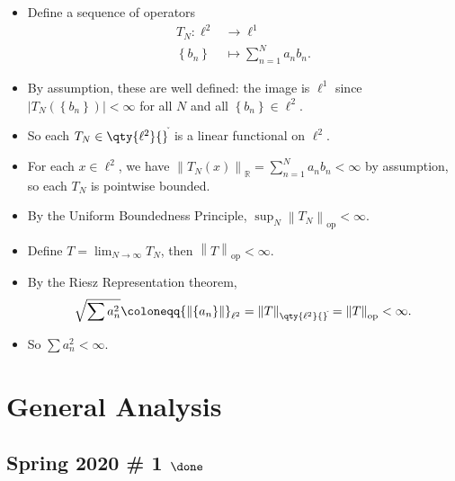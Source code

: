 
\begin{solution}

\envlist

\begin{itemize}
\item
  Define a sequence of operators
  \begin{align*}  
  T_N: \ell^2 &\to \ell^1\\
  \left\{{b_n}\right\} &\mapsto \sum_{n=1}^N a_n b_n
  .\end{align*}
\item
  By assumption, these are well defined: the image is \(\ell^1\) since
  \({\left\lvert {T_N(\left\{{b_n}\right\})} \right\rvert} < \infty\)
  for all \(N\) and all \(\left\{{b_n}\right\} \in \ell^2\).
\item
  So each \(T_N \in \qty{\ell^2} {}^{ \check{} }\) is a linear
  functional on \(\ell^2\).
\item
  For each \(x\in \ell^2\), we have
  \({\left\lVert {T_N(x)} \right\rVert}_{{\mathbb{R}}} = \sum_{n=1}^N a_n b_n < \infty\)
  by assumption, so each \(T_N\) is pointwise bounded.
\item
  By the Uniform Boundedness Principle,
  \(\sup_N {\left\lVert {T_N} \right\rVert}_{\text{op}} < \infty\).
\item
  Define \(T = \lim_{N \to\infty } T_N\), then
  \({\left\lVert {T} \right\rVert}_{\text{op}} < \infty\).
\item
  By the Riesz Representation theorem,
  \begin{align*}  
  \sqrt{\sum a_n^2} \coloneqq{\left\lVert {\left\{{a_n}\right\}} \right\rVert}_{\ell^2} = {\left\lVert {T} \right\rVert}_{\qty{\ell^2} {}^{ \check{} }} = {\left\lVert {T} \right\rVert}_{\text{op}} < \infty
  .\end{align*}
\item
  So \(\sum a_n^2 < \infty\).
\end{itemize}

\end{solution}

\hypertarget{general-analysis}{%
\section{General Analysis}\label{general-analysis}}

\hypertarget{spring-2020-1-done}{%
\subsection{\texorpdfstring{Spring 2020 \# 1
\(\done\)}{Spring 2020 \# 1 \textbackslash done}}\label{spring-2020-1-done}}

